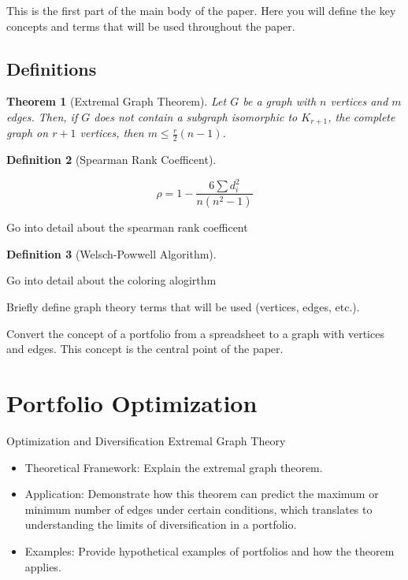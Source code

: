 \documentclass{article}
\newtheorem{theorem}{Theorem}[section]
\newtheorem{definition}[theorem]{Definition}
\begin{document}
This is the first part of the main body of the paper. Here you will define the key concepts and terms that will be used throughout the paper.

\subsection{Definitions}


\begin{theorem}[Extremal Graph Theorem]
    Let $G$ be a graph with $n$ vertices and $m$ edges. Then, if $G$ does not contain a subgraph isomorphic to $K_{r+1}$, the complete graph on $r+1$ vertices, then $m \leq \frac{r}{2}(n-1)$.
\end{theorem}


\begin{definition}[Spearman Rank Coefficent]
\end{definition}

\[
\rho = 1 - \frac{6 \sum d_i^2}{n(n^2-1)}
\]

Go into detail about the spearman rank coefficent


\begin{definition}[Welsch-Powwell Algorithm]
\end{definition}

Go into detail about the coloring alogirthm



Briefly define graph theory terms that will be used (vertices, edges, etc.). 


Convert the concept of a portfolio from a spreadsheet to a graph with vertices and edges. This concept is the central point of the paper.


\section{Portfolio Optimization}

Optimization and Diversification
Extremal Graph Theory

\begin{itemize}
    \item Theoretical Framework: Explain the extremal graph theorem.
    \item Application: Demonstrate how this theorem can predict the maximum or minimum number of edges under certain conditions, which translates to understanding the limits of diversification in a portfolio.
    \item Examples: Provide hypothetical examples of portfolios and how the theorem applies.
\end{itemize}
\end{document}
